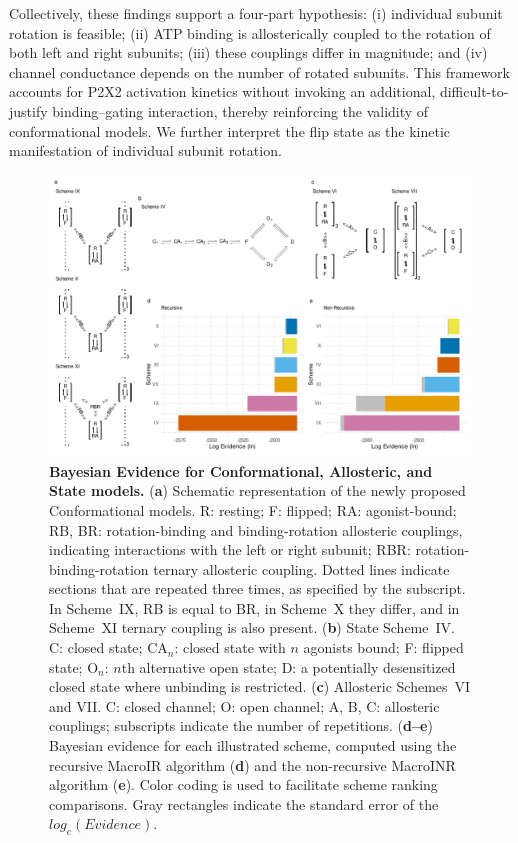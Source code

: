 \documentclass[pdflatex,sn-mathphys-num]{sn-jnl}%
\theoremstyle{thmstyleone}%
\theoremstyle{thmstyletwo}%
\theoremstyle{thmstylethree}%
\begin{document}
Collectively, these findings support a four-part hypothesis: (i) individual subunit rotation is feasible; (ii) ATP binding is allosterically coupled to the rotation of both left and right subunits; (iii) these couplings differ in magnitude; and (iv) channel conductance depends on the number of rotated subunits. This framework accounts for P2X2 activation kinetics without invoking an additional, difficult-to-justify binding–gating interaction, thereby reinforcing the validity of conformational models. We further interpret the flip state as the kinetic manifestation of individual subunit rotation.
\begin{figure}[t]
	\centering
	\includegraphics[width=\linewidth]{Figure_1.pdf}
	\caption{\textbf{Bayesian Evidence for Conformational, Allosteric, and State models.}  
		(\textbf{a}) Schematic representation of the newly proposed Conformational models. R: resting; F: flipped; RA: agonist-bound; RB, BR: rotation-binding and binding-rotation allosteric couplings, indicating interactions with the left or right subunit; RBR: rotation-binding-rotation ternary allosteric coupling. Dotted lines indicate sections that are repeated three times, as specified by the subscript. In Scheme~IX, RB is equal to BR, in Scheme~X they differ, and in Scheme~XI ternary coupling is also present.  
		(\textbf{b}) State Scheme~IV. C: closed state; CA$_n$: closed state with $n$ agonists bound; F: flipped state; O$_n$: $n$th alternative open state; D: a potentially desensitized closed state where unbinding is restricted.  
		(\textbf{c}) Allosteric Schemes~VI and VII. C: closed channel; O: open channel; A, B, C: allosteric couplings; subscripts indicate the number of repetitions.  
		(\textbf{d--e}) Bayesian evidence for each illustrated scheme, computed using the recursive MacroIR algorithm (\textbf{d}) and the non-recursive MacroINR algorithm (\textbf{e}). Color coding is used to facilitate scheme ranking comparisons. Gray rectangles indicate the standard error of the $log_e(Evidence)$.  
	}
	\label{fig:1}
\end{figure}
\end{document}
